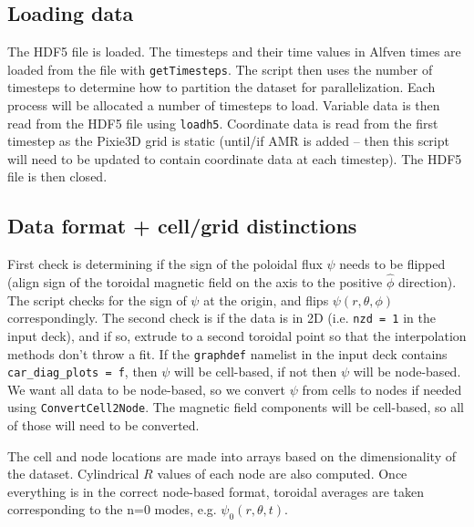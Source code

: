 \documentclass[12pt]{article}
\begin{document}
\subsection{Loading data}
The HDF5 file is loaded.
The timesteps and their time values in Alfven times are loaded from the file with \texttt{getTimesteps}.
The script then uses the number of timesteps to determine how to partition the dataset for parallelization.
Each process will be allocated a number of timesteps to load.
Variable data is then read from the HDF5 file using \texttt{loadh5}.
Coordinate data is read from the first timestep as the Pixie3D grid is static (until/if AMR is added -- then this script will need to be updated to contain coordinate data at each timestep).
The HDF5 file is then closed.

\subsection{Data format + cell/grid distinctions}
First check is determining if the sign of the poloidal flux $\psi$ needs to be flipped (align sign of the toroidal magnetic field on the axis to the positive $\hat{\phi}$ direction).
The script checks for the sign of $\psi$ at the origin, and flips $\psi(r,\theta,\phi)$ correspondingly.
The second check is if the data is in 2D (i.e. \texttt{nzd = 1} in the input deck), and if so, extrude to a second toroidal point so that the interpolation methods don't throw a fit.
If the \texttt{graphdef} namelist in the input deck contains \texttt{car\_diag\_plots = f}, then $\psi$ will be cell-based, if not then $\psi$ will be node-based.
We want all data to be node-based, so we convert $\psi$ from cells to nodes if needed using \texttt{ConvertCell2Node}.
The magnetic field components will be cell-based, so all of those will need to be converted.

The cell and node locations are made into arrays based on the dimensionality of the dataset.
Cylindrical $R$ values of each node are also computed.
Once everything is in the correct node-based format, toroidal averages are taken corresponding to the n=0 modes, e.g. $\psi_0(r,\theta,t)$.
\end{document}

